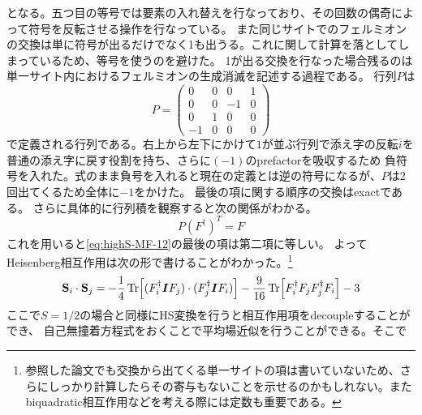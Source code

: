 \documentclass[11pt, aps, longbibliography]{article}
\begin{document}
        となる。五つ目の等号では要素の入れ替えを行なっており、その回数の偶奇によって符号を反転させる操作を行なっている。
        また同じサイトでのフェルミオンの交換は単に符号が出るだけでなく1も出うる。これに関して計算を落としてしまっているため、等号を使うのを避けた。
        1が出る交換を行なった場合残るのは単一サイト内におけるフェルミオンの生成消滅を記述する過程である。
        行列$P$は
        \begin{equation}
            P = \begin{pmatrix}\label{eq:highS-MF-13}
                0 & 0 & 0 & 1 \\ 0 & 0 & -1 & 0 \\ 0 & 1 & 0 & 0 \\ -1 & 0 & 0 & 0 
            \end{pmatrix}
        \end{equation}
        で定義される行列である。右上から左下にかけて$1$が並ぶ行列で添え字の反転$\bar{i}$を普通の添え字に戻す役割を持ち、さらに$(-1)$のprefactorを吸収するため
        負符号を入れた。式のまま負号を入れると現在の定義とは逆の符号になるが、$P$は2回出てくるため全体に$-1$をかけた。
        最後の項に関する順序の交換はexactである。
        さらに具体的に行列積を観察すると次の関係がわかる。
        \begin{equation}\label{eq:highS-MF-15}
            P(F^\dagger)^T = F
        \end{equation}
        これを用いると\eqref{eq:highS-MF-12}の最後の項は第二項に等しい。
        よってHeisenberg相互作用は次の形で書けることがわかった。\footnote{参照した論文\cite{PhysRevB.82.144422}でも交換から出てくる単一サイトの項は書いていないため、さらにしっかり計算したらその寄与もないことを示せるのかもしれない。またbiquadratic相互作用などを考える際には定数も重要である。}
        \begin{align}\label{eq:highS-MF-14}
            \mathbf{S}_i \cdot \mathbf{S}_j =  -\frac{1}{4}\Tr[(F_i^\dagger \boldsymbol{I} F_j) \cdot (F_j^\dagger \boldsymbol{I} F_i)] - \frac{9}{16}\Tr[F_i^\dagger F_j F_j^\dagger F_i]  - 3
        \end{align}
        ここで$S=1/2$の場合と同様にHS変換を行うと相互作用項をdecoupleすることができ、
        自己無撞着方程式をおくことで平均場近似を行うことができる。そこで
\end{document}

